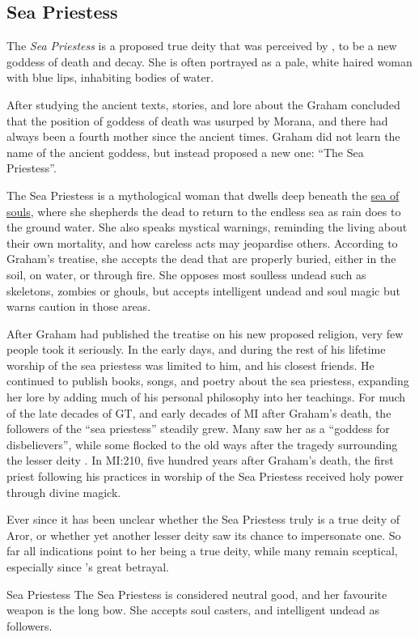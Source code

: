 \subsection{Sea Priestess}
\label{sec:Sea Priestess}

The \emph{Sea Priestess} is a proposed true deity that was perceived by
, to be a new goddess of death and decay. She is
often portrayed as a pale, white haired woman with blue lips, inhabiting
bodies of water.

After studying the ancient texts, stories, and lore about the  Graham concluded that the position of goddess of death was usurped by
Morana, and there had always been a fourth mother since the ancient times.
Graham did not learn the name of the ancient goddess, but instead proposed a
new one: ``The Sea Priestess''.

The Sea Priestess is a mythological woman that dwells deep beneath the
\hyperref[sec:Soul Well]{sea of souls}, where she shepherds the dead to
return to the endless sea as rain does to the ground water. She also speaks
mystical warnings, reminding the living about their own mortality, and how
careless acts may jeopardise others. According to Graham's treatise, she
accepts the dead that are properly buried, either in the soil, on water, or
through fire. She opposes most soulless undead such as skeletons, zombies or
ghouls, but accepts intelligent undead and soul magic but warns caution in
those areas.

After Graham had published the treatise on his new proposed religion, very
few people took it seriously. In the early days, and during the rest of his
lifetime worship of the sea priestess was limited to him, and his closest
friends. He continued to publish books, songs, and poetry about the sea
priestess, expanding her lore by adding much of his personal philosophy into
her teachings. For much of the late decades of GT, and early decades of MI
after Graham's death, the followers of the ``sea priestess'' steadily grew.
Many saw her as a ``goddess for disbelievers'', while some flocked to the old
ways after the tragedy surrounding the lesser deity .
In MI:210, five hundred years after Graham's death, the first priest following
his practices in worship of the Sea Priestess received holy power through
divine magick.

Ever since it has been unclear whether the Sea Priestess truly is a true deity
of Aror, or whether yet another lesser deity saw its chance to impersonate
one. So far all indications point to her being a true deity, while many remain
sceptical, especially since 's great betrayal.

\begin{35e}{Sea Priestess}
  The Sea Priestess is considered neutral good, and her favourite weapon is
  the long bow. She accepts soul casters, and intelligent undead as followers.
\end{35e}
